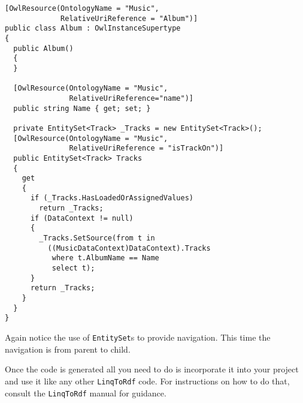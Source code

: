 \documentclass{article}
\def\l2r{\texttt{LinqToRdf}}
\begin{document}
\begin{verbatim}
[OwlResource(OntologyName = "Music", 
             RelativeUriReference = "Album")]
public class Album : OwlInstanceSupertype
{
  public Album()
  {
  }

  [OwlResource(OntologyName = "Music", 
               RelativeUriReference="name")]
  public string Name { get; set; }

  private EntitySet<Track> _Tracks = new EntitySet<Track>();
  [OwlResource(OntologyName = "Music", 
               RelativeUriReference = "isTrackOn")]
  public EntitySet<Track> Tracks
  {
    get
    {
      if (_Tracks.HasLoadedOrAssignedValues)
        return _Tracks;
      if (DataContext != null)
      {
        _Tracks.SetSource(from t in 
          ((MusicDataContext)DataContext).Tracks 
           where t.AlbumName == Name 
           select t);
      }
      return _Tracks;
    }
  }
}

\end{verbatim}

Again notice the use of \texttt{EntitySet}s to provide navigation. This time the
navigation is from parent to child.

Once the code is generated all you need to do is incorporate it into your
project and use it like any other \l2r{} code. For instructions on how to do
that, consult the \l2r{} manual for guidance.
\end{document}
